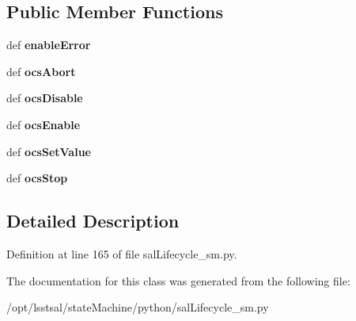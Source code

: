 \subsection*{Public Member Functions}
\begin{DoxyCompactItemize}
\item 
\hypertarget{classsal_lifecycle__sm_1_1_main_map___e_n_a_b_l_e_d_a142b9d53b23056fe1cdb4acb67c1f6bd}{def {\bfseries enable\-Error}}\label{classsal_lifecycle__sm_1_1_main_map___e_n_a_b_l_e_d_a142b9d53b23056fe1cdb4acb67c1f6bd}

\item 
\hypertarget{classsal_lifecycle__sm_1_1_main_map___e_n_a_b_l_e_d_ab0717532028be7ef92c47d7c1f67eb90}{def {\bfseries ocs\-Abort}}\label{classsal_lifecycle__sm_1_1_main_map___e_n_a_b_l_e_d_ab0717532028be7ef92c47d7c1f67eb90}

\item 
\hypertarget{classsal_lifecycle__sm_1_1_main_map___e_n_a_b_l_e_d_a4ad6c9393a013cbab8c1298d5c7b90c1}{def {\bfseries ocs\-Disable}}\label{classsal_lifecycle__sm_1_1_main_map___e_n_a_b_l_e_d_a4ad6c9393a013cbab8c1298d5c7b90c1}

\item 
\hypertarget{classsal_lifecycle__sm_1_1_main_map___e_n_a_b_l_e_d_af6f545b868e009472823d2801a18ef50}{def {\bfseries ocs\-Enable}}\label{classsal_lifecycle__sm_1_1_main_map___e_n_a_b_l_e_d_af6f545b868e009472823d2801a18ef50}

\item 
\hypertarget{classsal_lifecycle__sm_1_1_main_map___e_n_a_b_l_e_d_a29e538873ec8e57e5d75d88220df50fd}{def {\bfseries ocs\-Set\-Value}}\label{classsal_lifecycle__sm_1_1_main_map___e_n_a_b_l_e_d_a29e538873ec8e57e5d75d88220df50fd}

\item 
\hypertarget{classsal_lifecycle__sm_1_1_main_map___e_n_a_b_l_e_d_ab9920fcdc9c284a019c27ed01d0a9d29}{def {\bfseries ocs\-Stop}}\label{classsal_lifecycle__sm_1_1_main_map___e_n_a_b_l_e_d_ab9920fcdc9c284a019c27ed01d0a9d29}

\end{DoxyCompactItemize}


\subsection{Detailed Description}


Definition at line 165 of file sal\-Lifecycle\-\_\-sm.\-py.



The documentation for this class was generated from the following file\-:\begin{DoxyCompactItemize}
\item 
/opt/lsstsal/state\-Machine/python/sal\-Lifecycle\-\_\-sm.\-py\end{DoxyCompactItemize}
